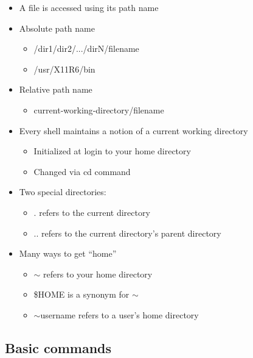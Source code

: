 \documentclass{beamer}[10pt, usepdftitle=false, handout]
\begin{document}
	\begin{frame}

	\begin{itemize}
	\item{A file is accessed using its path name}
	\item{Absolute path name
		\begin{itemize}
		\item{/dir1/dir2/.../dirN/filename}
		\item{/usr/X11R6/bin}
		\end{itemize}
	}
	\item{Relative path name
		\begin{itemize}
		\item{current‐working‐directory/filename}
		\end{itemize}
	}
	\item{Every shell maintains a notion of a current working directory
		\begin{itemize}
		\item{Initialized at login to your home directory}
		\item{Changed via cd command}
		\end{itemize}
	}
	\item{Two special directories:
	\begin{itemize}
		\item{. refers to the current directory}
		\item{.. refers to the current directory’s parent directory}
	\end{itemize} 
	}	
	\item{Many ways to get “home”
	\begin{itemize}
		\item{ $\sim$ refers to your home directory}
		\item{ \$HOME is a synonym for $\sim$ }
		\item{ $\sim$username refers to a user’s home directory}
	\end{itemize}
	}	
	\end{itemize}
	
	\end{frame}
	
	\subsection{Basic commands}	
	
\end{document}
